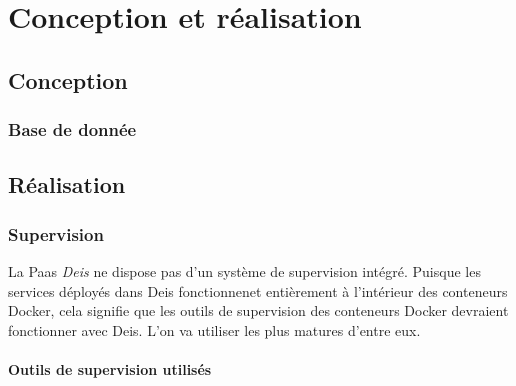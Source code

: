 \chapter{Conception et réalisation}
\begin{onehalfspace}

\newpage

\section{Conception}
\subsection{}
\subsection{Base de donnée}
\section{Réalisation}



\subsection{Supervision}

La Paas \emph{Deis} ne dispose pas d'un système de supervision intégré. Puisque les services déployés dans Deis fonctionnenet entièrement à l'intérieur des conteneurs Docker, cela signifie que les outils de supervision des conteneurs Docker devraient fonctionner avec Deis. L'on va utiliser les plus matures d'entre eux.


\subsubsection{Outils de supervision utilisés}






\end{onehalfspace}
